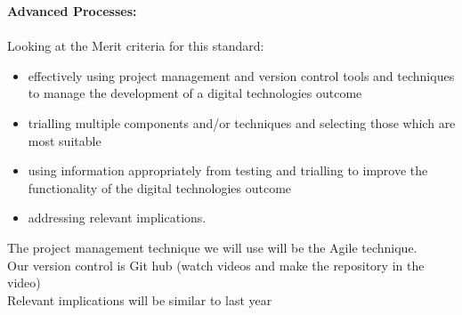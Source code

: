 \documentclass[a4paper,12pt]{article}
\begin{document}
	\Large \textbf{Advanced Processes:}\normalsize\\\\
Looking at the Merit criteria for this standard:
\begin{itemize}
	\item 	effectively using project management and version control tools and techniques to manage the development of a digital technologies outcome
	\item trialling multiple components and/or techniques and selecting those which are
	most suitable
	\item using information appropriately from testing and trialling to improve the
	functionality of the digital technologies outcome
	\item addressing relevant implications.
\end{itemize}
The project management technique we will use will be the Agile technique.\\
Our version control is Git hub (watch videos and make the repository in the video)\\
Relevant implications will be similar to last year\\
\end{document}
